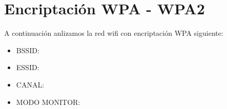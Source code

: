 \section{Encriptación WPA - WPA2}

A continuación anlizamos la red wifi con encriptación WPA siguiente:\\

\begin{itemize}
        \item BSSID: 
        \item ESSID: 
        \item CANAL: 
        \item MODO MONITOR: 
\end{itemize}
